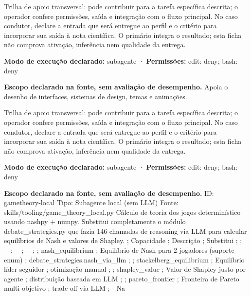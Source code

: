 \begin{funcao}
Trilha de apoio transversal: pode contribuir para a tarefa específica descrita; o operador confere permissões, saída e integração com o fluxo principal. No caso condutor, declare a entrada que será entregue ao perfil e o critério para incorporar sua saída à nota científica. O primário integra o resultado; esta ficha não comprova ativação, inferência nem qualidade da entrega.
\end{funcao}

\begin{arquitetura}
\textbf{Modo de execução declarado:} subagente · \textbf{Permissões:} edit: deny; bash: deny
\end{arquitetura}


\begin{descricao}
\textbf{Escopo declarado na fonte, sem avaliação de desempenho.}
Apoia o desenho de interfaces, sistemas de design, temas e animações.
\end{descricao}

\begin{funcao}
Trilha de apoio transversal: pode contribuir para a tarefa específica descrita; o operador confere permissões, saída e integração com o fluxo principal. No caso condutor, declare a entrada que será entregue ao perfil e o critério para incorporar sua saída à nota científica. O primário integra o resultado; esta ficha não comprova ativação, inferência nem qualidade da entrega.
\end{funcao}

\begin{arquitetura}
\textbf{Modo de execução declarado:} subagente · \textbf{Permissões:} edit: deny; bash: deny
\end{arquitetura}


\begin{descricao}
\textbf{Escopo declarado na fonte, sem avaliação de desempenho.}
ID: gametheory-local Tipo: Subagente local (sem LLM) Fonte: skills/tooling/game\_theory\_local.py Cálculo de teoria dos jogos determinístico usando nashpy + numpy. Substitui completamente o módulo debate\_strategies.py que fazia 146 chamadas de reasoning via LLM para calcular equilíbrios de Nash e valores de Shapley. ; Capacidade ; Descrição ; Substitui ; ; ---; ---; ---; ; nash\_equilibrium ; Equilíbrio de Nash para 2 jogadores (suporte enum) ; debate\_strategies.nash\_via\_llm ; ; stackelberg\_equilibrium ; Equilíbrio líder-seguidor ; otimização manual ; ; shapley\_value ; Valor de Shapley justo por agente ; distribuição baseada em LLM ; ; pareto\_frontier ; Fronteira de Pareto multi-objetivo ; trade-off via LLM ; - Na
\end{descricao}

